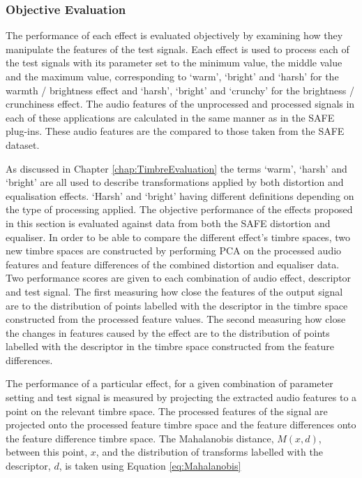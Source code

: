 		\subsubsection*{Objective Evaluation}
			The performance of each effect is evaluated objectively by examining how they manipulate the
			features of the test signals. Each effect is used to process each of the test signals with its
			parameter set to the minimum value, the middle value and the maximum value, corresponding to
			`warm', `bright' and `harsh' for the warmth / brightness effect and `harsh', `bright' and `crunchy'
			for the brightness / crunchiness effect. The audio features of the unprocessed and processed
			signals in each of these applications are calculated in the same manner as in the SAFE plug-ins.
			These audio features are the compared to those taken from the SAFE dataset.

			As discussed in Chapter \ref{chap:TimbreEvaluation} the terms `warm', `harsh' and `bright' are all
			used to describe transformations applied by both distortion and equalisation effects. `Harsh' and
			`bright' having different definitions depending on the type of processing applied. The objective
			performance of the effects proposed in this section is evaluated against data from both the SAFE
			distortion and equaliser. In order to be able to compare the different effect's timbre spaces, two
			new timbre spaces are constructed by performing PCA on the processed audio features and feature
			differences of the combined distortion and equaliser data. Two performance scores are given to each
			combination of audio effect, descriptor and test signal. The first measuring how close the features
			of the output signal are to the distribution of points labelled with the descriptor in the timbre
			space constructed from the processed feature values. The second measuring how close the changes in
			features caused by the effect are to the distribution of points labelled with the descriptor in the
			timbre space constructed from the feature differences.

			The performance of a particular effect, for a given combination of parameter setting and test
			signal is measured by projecting the extracted audio features to a point on the relevant timbre
			space. The processed features of the signal are projected onto the processed feature timbre space
			and the feature differences onto the feature difference timbre space. The Mahalanobis distance,
			$M(x, d)$, between this point, $x$, and the distribution of transforms labelled with the
			descriptor, $d$, is taken using Equation \ref{eq:Mahalanobis}
			

